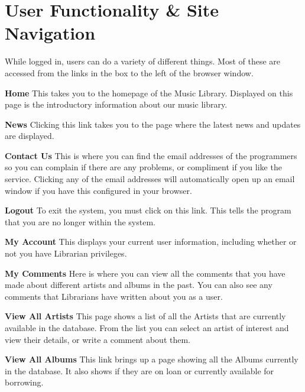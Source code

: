\documentclass{article}
\begin{document}
\section{User Functionality \& Site Navigation}
While logged in, users can do a variety of different things. Most of these are accessed from the links in the box to the left of the browser window.
\begin{description}
\item{\bf{Home}}
This takes you to the homepage of the Music Library. Displayed on this page is the introductory information about our music library.
\item{\bf{News}}
Clicking this link takes you to the page where the latest news and updates are displayed.
\item{\bf{Contact Us}}
This is where you can find the email addresses of the programmers so you can complain if there are any problems, or compliment if you like the service. Clicking any of the email addresses will automatically open up an email window if you have this configured in your browser.

\item{\bf{Logout}}
To exit the system, you must click on this link. This tells the program that you are no longer within the system.
\item{\bf{My Account}}
This displays your current user information, including whether or not you have Librarian privileges.
\item{\bf{My Comments}}
Here is where you can view all the comments that you have made about different artists and albums in the past. You can also see any comments that Librarians have written about you as a user.
\item{\bf{View All Artists}}
This page shows a list of all the Artists that are currently available in the database. From the list you can select an artist of interest and view their details, or write a comment about them.

\item{\bf{View All Albums}}
This link brings up a page showing all the Albums currently in the database. It also shows if they are on loan or currently available for borrowing.
\end{description}
\end{document}
